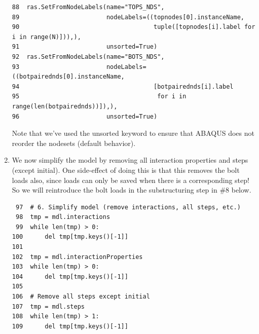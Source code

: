 \documentclass[11pt]{article}
\begin{document}
\begin{enumerate}
\begin{verbatim}
88  ras.SetFromNodeLabels(name="TOPS_NDS", 
89                        nodeLabels=((topnodes[0].instanceName, 
90                                     tuple([topnodes[i].label for i in range(N)])),),
91                        unsorted=True)
92  ras.SetFromNodeLabels(name="BOTS_NDS", 
93                        nodeLabels=((botpairednds[0].instanceName, 
94                                     [botpairednds[i].label
95                                      for i in range(len(botpairednds))]),),
96                        unsorted=True)
\end{verbatim}
Note that we've used the unsorted keyword to ensure that ABAQUS does not reorder the nodesets (default behavior).
\item We now simplify the model by removing all interaction properties and steps (except initial).
One side-effect of doing this is that this removes the bolt loads also, since loads can only be saved when there is a corresponding step!
So we will reintroduce the bolt loads in the substructuring step in \#8 below.
\begin{verbatim}
 97  # 6. Simplify model (remove interactions, all steps, etc.)
 98  tmp = mdl.interactions
 99  while len(tmp) > 0:
100      del tmp[tmp.keys()[-1]]
101  
102  tmp = mdl.interactionProperties
103  while len(tmp) > 0:
104      del tmp[tmp.keys()[-1]]
105  
106  # Remove all steps except initial
107  tmp = mdl.steps
108  while len(tmp) > 1:
109      del tmp[tmp.keys()[-1]]
\end{verbatim}
\end{enumerate}
\end{document}
